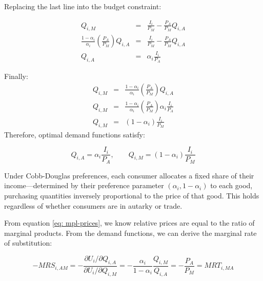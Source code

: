 \documentclass[11pt,letterpaper]{article}
\begin{document}
\normalsize
Replacing the last line into the budget constraint:

\scriptsize{
\begin{eqnarray*}
    Q_{i,M}&=& \frac{I_i}{P_{M}} - \frac{P_{A}}{P_{M} } Q_{i,A} \\
    \frac{1-\alpha_i}{\alpha_i } \left( \frac{P_{A}}{P_{M}}\right) Q_{i,A} &=& \frac{I_i}{P_{M}} - \frac{P_{A}}{P_{M} } Q_{i,A} \\
    Q_{i,A} &=& \alpha_i  \frac{I_i}{P_{A}}
\end{eqnarray*}

}

\normalsize
Finally:
{\scriptsize
\begin{eqnarray*}
     Q_{i,M}  &=& \frac{1-\alpha_i}{\alpha_i } \left( \frac{P_{A}}{P_{M}}\right) Q_{i,A}  \\
     Q_{i,M}  &=& \frac{1-\alpha_i}{\alpha_i } \left( \frac{P_{A}}{P_{M}}\right) \alpha_i  \frac{I_i}{P_{A}} \\
      Q_{i,M}  &=& (1-\alpha_i) \frac{I_i}{P_{M}}
\end{eqnarray*}
}
\normalsize
Therefore, optimal demand functions satisfy:

\begin{equation}\label{eq: demand}
    Q_{i,A} = \alpha_i  \frac{I_i}{P_{A}}, \qquad Q_{i,M} = (1-\alpha_i) \frac{I_i}{P_{M}}
\end{equation}
\normalsize

Under Cobb-Douglas preferences, each consumer allocates a fixed share of their income—determined by their preference parameter $(\alpha_i, 1-\alpha_i)$ to each good, purchasing quantities inversely proportional to the price of that good. This holds regardless of whether consumers are in autarky or trade.

From equation \eqref{eq: mpl-prices}, we know relative prices are equal to the ratio of marginal products. From the demand functions, we can derive the marginal rate of substitution:

\begin{equation}
    -MRS_{i,AM} = -\frac{\partial U_i / \partial Q_{i,A} }{ \partial U_i / \partial Q_{i,M} } = -\frac{\alpha_i}{1-\alpha_i} \frac{Q_{i,M}}{Q_{i,A}} = -\frac{P_A}{P_M} = MRT_{i,MA}
\end{equation}
\end{document}
